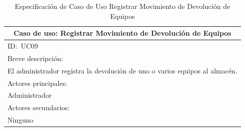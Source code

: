 \documentclass[stu, 12pt, letterpaper, donotrepeattitle, floatsintext, natbib]{apa7}
\begin{document}
\newpage
\begin{longtable}{@{} p{16.5cm} @{}}
    \caption{Especificaci\'on de Caso de Uso Registrar Movimiento de Devoluci\'on de Equipos}\label{tab:UC09}                                                                                                                            \\ \toprule
    \multicolumn{1}{c}{Caso de uso: Registrar Movimiento de Devoluci\'on de Equipos}                                                                                                                                                     \\ \midrule
    ID:~UC09                                                                                                                                                                                                                             \\ \midrule
    Breve descripci\'on:                                                                                                                                                                                                                 \\
    El administrador registra la devoluci\'on de uno o varios equipos al almac\'en.                                                                                                                                                      \\ \midrule
    Actores principales:                                                                                                                                                                                                                 \\
    Administrador                                                                                                                                                                                                                        \\ \midrule
    Actores secundarios:                                                                                                                                                                                                                 \\
    Ninguno                                                                                                                                                                                                                              \\ \midrule

\end{longtable}
\end{document}
